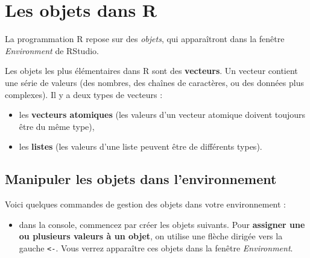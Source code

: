 \documentclass[
]{book}
\providecommand{\tightlist}{%
  \setlength{\itemsep}{0pt}\setlength{\parskip}{0pt}}
\begin{document}
\chapter{Les objets dans R}\label{les-objets-dans-r}

La programmation R repose sur des \emph{objets}, qui apparaîtront dans la fenêtre \emph{Environment} de RStudio.

Les objets les plus élémentaires dans R sont des \textbf{vecteurs}. Un vecteur contient une série de valeurs (des nombres, des chaînes de caractères, ou des données plus complexes). Il y a deux types de vecteurs :

\begin{itemize}
\tightlist
\item
  les \textbf{vecteurs atomiques} (les valeurs d'un vecteur atomique doivent toujours être du même type),
\item
  les \textbf{listes} (les valeurs d'une liste peuvent être de différents types).
\end{itemize}

\section{Manipuler les objets dans l'environnement}\label{manipuler-les-objets-dans-lenvironnement}

Voici quelques commandes de gestion des objets dans votre environnement :

\begin{itemize}
\tightlist
\item
  dans la console, commencez par créer les objets suivants. Pour \textbf{assigner une ou plusieurs valeurs à un objet}, on utilise une flèche dirigée vers la gauche \texttt{\textless{}-}. Vous verrez apparaître ces objets dans la fenêtre \emph{Environment}.
\end{itemize}
\end{document}
